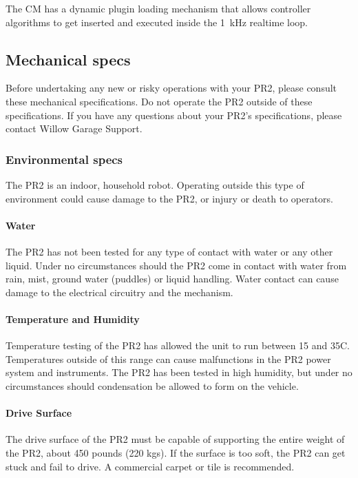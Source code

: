 The CM has a dynamic plugin loading mechanism that allows controller
algorithms to get inserted and executed inside the 1~kHz realtime
loop.


\subsection{Mechanical specs}

Before undertaking any new or risky operations with your PR2, please consult these mechanical specifications. Do not operate the PR2 outside of these specifications. If you have any questions about your PR2's specifications, please contact Willow Garage Support.

\subsubsection{Environmental specs}

The PR2 is an indoor, household robot. Operating outside this type of environment could cause damage to the PR2, or injury or death to operators.

\paragraph{Water}

The PR2 has not been tested for any type of contact with water or any other liquid. Under no circumstances should the PR2 come in contact with water from rain, mist, ground water (puddles) or liquid handling. Water contact can cause damage to the electrical circuitry and the mechanism.

\paragraph{Temperature and Humidity}

Temperature testing of the PR2 has allowed the unit to run between 15 and 35C. Temperatures outside of this range can cause malfunctions in the PR2 power system and instruments. The PR2 has been tested in high humidity, but under no circumstances should condensation be allowed to form on the vehicle.

\paragraph{Drive Surface}

The drive surface of the PR2 must be capable of supporting the entire weight of the PR2, about 450 pounds (220 kgs). If the surface is too soft, the PR2 can get stuck and fail to drive. A commercial carpet or tile is recommended. 

